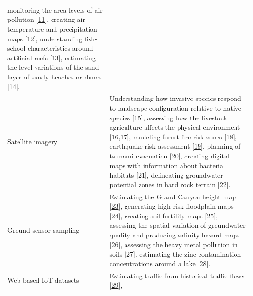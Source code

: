 \documentclass[
  11pt,
  a4paper,
  oneside, openany  ,captions=tableheading
]{scrbook}
\theoremstyle{remark}
\begin{document}
\begin{longtable}[]{@{}
  >{\raggedright\arraybackslash}p{}
  >{\raggedright\arraybackslash}p{}@{}}
monitoring the area levels of air pollution
{[}\href{https://www.mdpi.com/2220-9964/7/7/269\#B46-ijgi-07-00269}{11}{]},
creating air temperature and precipitation maps
{[}\href{https://www.mdpi.com/2220-9964/7/7/269\#B70-ijgi-07-00269}{12}{]},
understanding fish-school characteristics around artificial reefs
{[}\href{https://www.mdpi.com/2220-9964/7/7/269\#B67-ijgi-07-00269}{13}{]},
estimating the level variations of the sand layer of sandy beaches or
dunes
{[}\href{https://www.mdpi.com/2220-9964/7/7/269\#B66-ijgi-07-00269}{14}{]}. \\
Satellite imagery & Understanding how invasive species respond to
landscape configuration relative to native species
{[}\href{https://www.mdpi.com/2220-9964/7/7/269\#B49-ijgi-07-00269}{15}{]},
assessing how the livestock agriculture affects the physical environment
{[}\href{https://www.mdpi.com/2220-9964/7/7/269\#B35-ijgi-07-00269}{16},\href{https://www.mdpi.com/2220-9964/7/7/269\#B50-ijgi-07-00269}{17}{]},
modeling forest fire risk zones
{[}\href{https://www.mdpi.com/2220-9964/7/7/269\#B33-ijgi-07-00269}{18}{]},
earthquake risk assessment
{[}\href{https://www.mdpi.com/2220-9964/7/7/269\#B34-ijgi-07-00269}{19}{]},
planning of tsunami evacuation
{[}\href{https://www.mdpi.com/2220-9964/7/7/269\#B36-ijgi-07-00269}{20}{]},
creating digital maps with information about bacteria habitats
{[}\href{https://www.mdpi.com/2220-9964/7/7/269\#B47-ijgi-07-00269}{21}{]},
delineating groundwater potential zones in hard rock terrain
{[}\href{https://www.mdpi.com/2220-9964/7/7/269\#B39-ijgi-07-00269}{22}{]}. \\
Ground sensor sampling & Estimating the Grand Canyon height map
{[}\href{https://www.mdpi.com/2220-9964/7/7/269\#B63-ijgi-07-00269}{23}{]},
generating high-risk floodplain maps
{[}\href{https://www.mdpi.com/2220-9964/7/7/269\#B63-ijgi-07-00269}{24}{]},
creating soil fertility maps
{[}\href{https://www.mdpi.com/2220-9964/7/7/269\#B72-ijgi-07-00269}{25}{]},
assessing the spatial variation of groundwater quality and producing
salinity hazard maps
{[}\href{https://www.mdpi.com/2220-9964/7/7/269\#B69-ijgi-07-00269}{26}{]},
assessing the heavy metal pollution in soils
{[}\href{https://www.mdpi.com/2220-9964/7/7/269\#B71-ijgi-07-00269}{27}{]},
estimating the zinc contamination concentrations around a lake
{[}\href{https://www.mdpi.com/2220-9964/7/7/269\#B68-ijgi-07-00269}{28}{]}. \\
Web-based IoT datasets & Estimating traffic from historical traffic
flows
{[}\href{https://www.mdpi.com/2220-9964/7/7/269\#B42-ijgi-07-00269}{29}{]},

\end{longtable}
\end{document}
